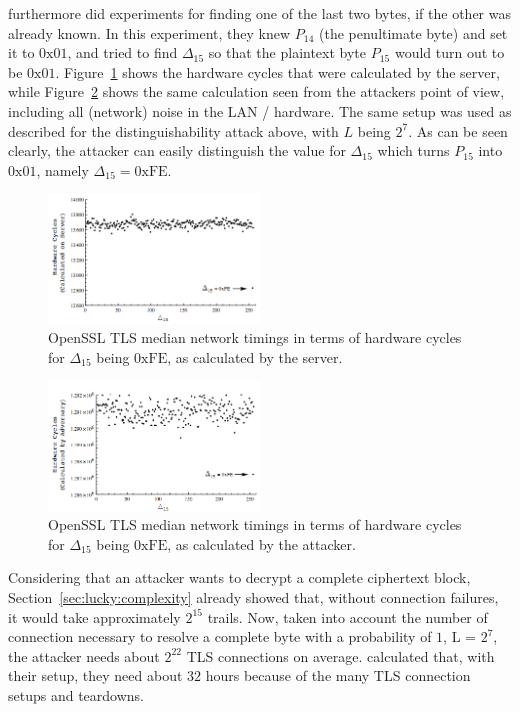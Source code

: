 \documentclass[10pt,conference,a4paper]{IEEEtran}
\begin{document}
\citeauthor{alfardan2013lucky} furthermore did experiments for finding one of the last two bytes, if the other was already known. In this experiment, they knew $P_{14}$ (the penultimate byte) and set it to $0\text{x}01$, and tried to find $\Delta_{15}$ so that the plaintext byte $P_{15}$ would turn out to be $0\text{x}01$. Figure~\ref{fig:luckybyteserver} shows the hardware cycles that were calculated by the server, while Figure~\ref{fig:luckybyteattacker} shows the same calculation seen from the attackers point of view, including all (network) noise in the LAN / hardware. The same setup was used as described for the distinguishability attack above, with $L$ being $2^7$. As can be seen clearly, the attacker can easily distinguish the value for $\Delta_{15}$ which turns $P_{15}$ into $0\text{x}01$, namely $\Delta_{15} = 0\text{xFE}$.

\begin{figure}[h]
	\centering
	\includegraphics[width=0.5\textwidth]{lucky_byte_server.png}
	\caption{OpenSSL TLS median network timings in terms of hardware cycles for $\Delta_{15}$ being $0\text{xFE}$, as calculated by the server.~\cite{alfardan2013lucky}}
	\label{fig:luckybyteserver}
\end{figure}

\begin{figure}[h]
	\centering
	\includegraphics[width=0.5\textwidth]{lucky_byte_attacker.png}
	\caption{OpenSSL TLS median network timings in terms of hardware cycles for $\Delta_{15}$ being $0\text{xFE}$, as calculated by the attacker.~\cite{alfardan2013lucky}}
	\label{fig:luckybyteattacker}
\end{figure}

Considering that an attacker wants to decrypt a complete ciphertext block, Section~\ref{sec:lucky:complexity} already showed that, without connection failures, it would take approximately $2^{15}$ trails. Now, taken into account the number of connection necessary to resolve a complete byte with a probability of $1$, L = $2^7$, the attacker needs about $2^{22}$ TLS connections on average. \citeauthor{alfardan2013lucky} calculated that, with their setup, they need about $32$ hours because of the many TLS connection setups and teardowns.
\end{document}
